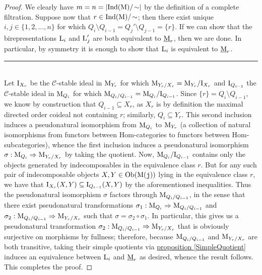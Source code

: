 \noindent\begin{proof} We clearly have $m = n = \lvert\textnormal{Ind}(\textnormal{M})/\!\sim\rvert$ by the definition of a complete filtration. Suppose now that $r \in \textnormal{Ind}(\textnormal{M})/\!\sim$; then there exist unique $i, j \in \{1, 2, \dots, n\}$ for which $Q_i\setminus Q_{i-1} = Q_j'\setminus Q_{j-1} = \{r\}$. If we can show that the birepresentations $\textnormal{L}_i$ and $\textnormal{L}_j'$ are both equivalent to $\underline{\textnormal{M}}_r$, then we are done. In particular, by symmetry it is enough to show that $\textnormal{L}_i$ is equivalent to $\underline{\textnormal{M}}_r$.\\[-1.5\baselineskip]
\begin{center}
\rule{0.5\linewidth}{1pt}
\end{center}
\noindent\\[-\baselineskip]
\noindent Let $\textnormal{I}_{X_r}$ be the $\mathscr{C}$-stable ideal in $\textnormal{M}_{Y_r}$ for which $\textnormal{M}_{Y_r/X_r} = \textnormal{M}_{Y_r}/\textnormal{I}_{X_r}$ and $\textnormal{I}_{Q_{i-1}}$ the $\mathscr{C}$-stable ideal in $\textnormal{M}_{Q_i}$ for which $\textnormal{M}_{Q_i/Q_{i-1}} = \textnormal{M}_{Q_i}/\textnormal{I}_{Q_{i-1}}$. Since $\{r\} = Q_i\setminus Q_{i-1}$, we know by construction that $Q_{i-1} \subseteq X_r$, as $X_r$ is by definition the maximal directed order coideal not containing $r$; similarly, $Q_i \subseteq Y_r$. This second inclusion induces a pseudonatural isomorphism from $\textnormal{M}_{Q_i}$ to $\textnormal{M}_{Y_r}$ (a collection of natural isomorphisms from functors between Hom-categories to functors between Hom-subcategories), whence the first inclusion induces a pseudonatural isomorphism $\sigma : \textnormal{M}_{Q_i} \Rightarrow \textnormal{M}_{Y_r/X_r}$ by taking the quotient. Now, $\textnormal{M}_{Q_i}/\textnormal{I}_{Q_{i-1}}$ contains only the objects generated by indecomposables in the equivalence class $r$. But for any such pair of indecomposable objects $X, Y \in \textnormal{Ob}(\textnormal{M}(\textnormal{\texttt{j}}))$ lying in the equivalence class $r$, we have that $\textnormal{I}_{X_r}(X, Y) \subseteq \textnormal{I}_{Q_{i-1}}(X, Y)$ by the aforementioned inequalities. Thus the pseudonatural isomorphism $\sigma$ factors through $\textnormal{M}_{Q_i/Q_{i-1}}$, in the sense that there exist pseudonatural transformations $\sigma_1 : \textnormal{M}_{Q_i} \Rightarrow \textnormal{M}_{Q_i/Q_{i-1}}$ and $\sigma_2 : \textnormal{M}_{Q_i/Q_{i-1}} \Rightarrow \textnormal{M}_{Y_r/X_r}$ such that $\sigma = \sigma_2 \circ \sigma_1$. In particular, this gives us a pseudonatural transformation $\sigma_2 : \textnormal{M}_{Q_i/Q_{i-1}} \Rightarrow \textnormal{M}_{Y_r/X_r}$ that is obviously surjective on morphisms by fullness; therefore, because $\textnormal{M}_{Q_i/Q_{i-1}}$ and $\textnormal{M}_{Y_r/X_r}$ are both transitive, taking their simple quotients via \hyperref[SimpleQuotient]{proposition \ref*{SimpleQuotient}} induces an equivalence between $\textnormal{L}_i$ and $\underline{\textnormal{M}}_r$ as desired, whence the result follows. This completes the proof.
\end{proof}\\

